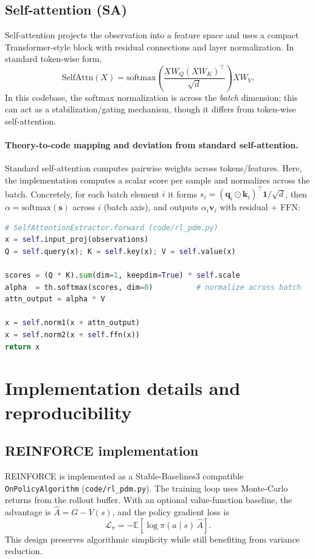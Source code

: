 \documentclass[11pt]{article}
\begin{document}
\subsection{Self-attention (SA)}
Self-attention projects the observation into a feature space and uses a compact Transformer-style block with residual connections and layer normalization. In standard token-wise form,
\begin{equation}
\mathrm{SelfAttn}(X)=\mathrm{softmax}\left(\frac{XW_Q(XW_K)^\top}{\sqrt{d}}\right)XW_V.
\end{equation}
In this codebase, the softmax normalization is across the \emph{batch} dimension; this can act as a stabilization/gating mechanism, though it differs from token-wise self-attention.

\paragraph{Theory-to-code mapping and deviation from standard self-attention.}
Standard self-attention computes pairwise weights across tokens/features. Here, the implementation computes a scalar score per sample and normalizes across the batch. Concretely, for each batch element $i$ it forms $s_i=(\mathbf{q}_i\odot\mathbf{k}_i)^\top\mathbf{1}/\sqrt{d}$, then $\alpha=\mathrm{softmax}(\mathbf{s})$ across $i$ (batch axis), and outputs $\alpha_i\mathbf{v}_i$ with residual + FFN:
\begin{lstlisting}[language=Python]
# SelfAttentionExtractor.forward (code/rl_pdm.py)
x = self.input_proj(observations)
Q = self.query(x); K = self.key(x); V = self.value(x)

scores = (Q * K).sum(dim=1, keepdim=True) * self.scale
alpha  = th.softmax(scores, dim=0)          # normalize across batch
attn_output = alpha * V

x = self.norm1(x + attn_output)
x = self.norm2(x + self.ffn(x))
return x
\end{lstlisting}

\section{Implementation details and reproducibility}
\label{sec:implementation}
\subsection{REINFORCE implementation}
\label{sec:reinforce_impl}
REINFORCE is implemented as a Stable-Baselines3 compatible \texttt{OnPolicyAlgorithm} (\texttt{code/rl\_pdm.py}). The training loop uses Monte-Carlo returns from the rollout buffer. With an optional value-function baseline, the advantage is $\hat{A}=G-V(s)$, and the policy gradient loss is
\begin{equation}
	\mathcal{L}_{\pi} = -\mathbb{E}[\log\pi(a\mid s)\,\hat{A}].
\end{equation}
This design preserves algorithmic simplicity while still benefiting from variance reduction.
\end{document}
